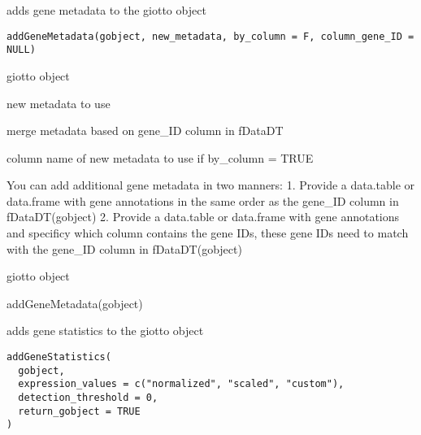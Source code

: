 \documentclass[a4paper]{book}
\begin{document}
%
\begin{Description}\relax
adds gene metadata to the giotto object
\end{Description}
%
\begin{Usage}
\begin{verbatim}
addGeneMetadata(gobject, new_metadata, by_column = F, column_gene_ID = NULL)
\end{verbatim}
\end{Usage}
%
\begin{Arguments}
\begin{ldescription}
\item[\code{gobject}] giotto object

\item[\code{new\_metadata}] new metadata to use

\item[\code{by\_column}] merge metadata based on gene\_ID column in fDataDT

\item[\code{column\_cell\_ID}] column name of new metadata to use if by\_column = TRUE
\end{ldescription}
\end{Arguments}
%
\begin{Details}\relax
You can add additional gene metadata in two manners:
1. Provide a data.table or data.frame with gene annotations in the same order as the gene\_ID column in fDataDT(gobject)
2. Provide a data.table or data.frame with gene annotations and specificy which column contains the gene IDs,
these gene IDs need to match with the gene\_ID column in fDataDT(gobject)
\end{Details}
%
\begin{Value}
giotto object
\end{Value}
%
\begin{Examples}
\begin{ExampleCode}
    addGeneMetadata(gobject)
\end{ExampleCode}
\end{Examples}
%
\begin{Description}\relax
adds gene statistics to the giotto object
\end{Description}
%
\begin{Usage}
\begin{verbatim}
addGeneStatistics(
  gobject,
  expression_values = c("normalized", "scaled", "custom"),
  detection_threshold = 0,
  return_gobject = TRUE
)
\end{verbatim}
\end{Usage}
\end{document}
